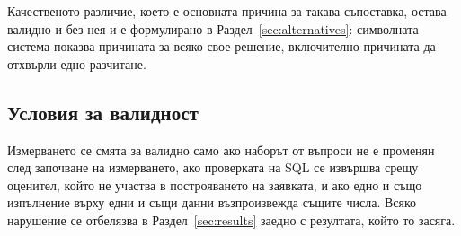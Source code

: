 Качественото различие, което е основната причина за такава съпоставка, остава валидно и
без нея и е формулирано в Раздел~\ref{sec:alternatives}: символната система показва
причината за всяко свое решение, включително причината да отхвърли едно разчитане.

\subsection{Условия за валидност}

Измерването се смята за валидно само ако наборът от въпроси не е променян след започване
на измерването, ако проверката на SQL се извършва срещу оценител, който не участва в
построяването на заявката, и ако едно и също изпълнение върху едни и същи данни
възпроизвежда същите числа. Всяко нарушение се отбелязва в Раздел~\ref{sec:results}
заедно с резултата, който то засяга.
